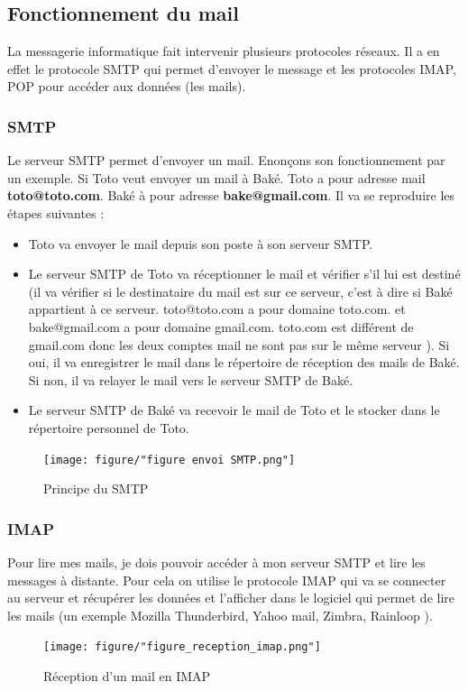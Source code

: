 \documentclass[a4paper,12pt,french]{report} %
\begin{document}
\subsection{Fonctionnement du mail}
La messagerie informatique fait intervenir plusieurs protocoles réseaux. Il a en effet le protocole SMTP qui permet d'envoyer le message et les protocoles IMAP, POP pour accéder aux données (les mails).
\subsubsection{SMTP}
Le serveur SMTP permet d'envoyer un mail. Enonçons son fonctionnement par un exemple. Si Toto veut envoyer un mail à Baké. Toto a pour adresse mail \textbf{toto@toto.com}. Baké à pour adresse \textbf{bake@gmail.com}. Il va se reproduire les étapes suivantes :
\begin{itemize}
	\item Toto va envoyer le mail depuis son poste à son serveur SMTP. 
	\item Le serveur SMTP de Toto va réceptionner le mail et vérifier s'il lui est destiné (il va vérifier si le destinataire du mail est sur ce serveur, c'est à dire si Baké appartient à ce serveur. toto@toto.com a pour domaine toto.com. et bake@gmail.com a pour domaine gmail.com. toto.com est différent de gmail.com donc les deux comptes mail ne sont pas sur le même serveur ). Si oui, il va enregistrer le mail dans le répertoire de réception des mails de Baké. Si non, il va relayer le mail vers le serveur SMTP de Baké. 
	\item Le serveur SMTP de Baké va recevoir le mail de Toto et le stocker dans le répertoire personnel de Toto.	   
\end{itemize}
\begin{figure}[H]
\centering
\texttt{[image: figure/"figure envoi SMTP.png"]}
\caption{Principe du SMTP}
\label{Principer du SMTP}
\end{figure}

\subsubsection{ IMAP}
	Pour lire mes mails, je dois pouvoir accéder à mon serveur SMTP et lire les messages à distante. Pour cela on utilise le protocole IMAP qui va se connecter au serveur et récupérer les données et l'afficher dans le logiciel qui permet de lire les mails (un exemple Mozilla Thunderbird, Yahoo mail, Zimbra, Rainloop ). 
\begin{figure}[H]
\centering
\texttt{[image: figure/"figure\_reception\_imap.png"]} 
\caption{Réception d'un mail en IMAP}
\label{Reception d'un mail en IMAP}
\end{figure}
\end{document}
